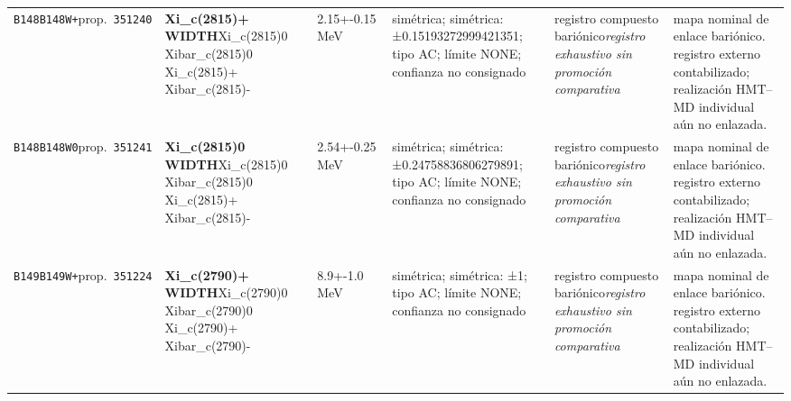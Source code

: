 \begin{landscape}
\begin{longtable}{L{1.85cm}L{4.45cm}L{2.35cm}L{4.05cm}L{3.35cm}L{7.15cm}}
\texttt{B148}\newline \texttt{B148W+}\newline prop.\ \texttt{351240} & \textbf{Xi\_\allowbreak{}c(2815)+ WIDTH}\newline Xi\_\allowbreak{}c(2815)0 \textbar{}\allowbreak{} Xibar\_\allowbreak{}c(2815)0 \textbar{}\allowbreak{} Xi\_\allowbreak{}c(2815)+ \textbar{}\allowbreak{} Xibar\_\allowbreak{}c(2815)- & 2.15+-0.15\,MeV & simétrica; simétrica: ±0.15193272999421351; tipo AC; límite NONE; confianza no consignado & registro compuesto bariónico\newline \emph{registro exhaustivo sin promoción comparativa} & mapa nominal de enlace bariónico. registro externo contabilizado; realización HMT--MD individual aún no enlazada. \\
\texttt{B148}\newline \texttt{B148W0}\newline prop.\ \texttt{351241} & \textbf{Xi\_\allowbreak{}c(2815)0 WIDTH}\newline Xi\_\allowbreak{}c(2815)0 \textbar{}\allowbreak{} Xibar\_\allowbreak{}c(2815)0 \textbar{}\allowbreak{} Xi\_\allowbreak{}c(2815)+ \textbar{}\allowbreak{} Xibar\_\allowbreak{}c(2815)- & 2.54+-0.25\,MeV & simétrica; simétrica: ±0.24758836806279891; tipo AC; límite NONE; confianza no consignado & registro compuesto bariónico\newline \emph{registro exhaustivo sin promoción comparativa} & mapa nominal de enlace bariónico. registro externo contabilizado; realización HMT--MD individual aún no enlazada. \\
\texttt{B149}\newline \texttt{B149W+}\newline prop.\ \texttt{351224} & \textbf{Xi\_\allowbreak{}c(2790)+ WIDTH}\newline Xi\_\allowbreak{}c(2790)0 \textbar{}\allowbreak{} Xibar\_\allowbreak{}c(2790)0 \textbar{}\allowbreak{} Xi\_\allowbreak{}c(2790)+ \textbar{}\allowbreak{} Xibar\_\allowbreak{}c(2790)- & 8.9+-1.0\,MeV & simétrica; simétrica: ±1; tipo AC; límite NONE; confianza no consignado & registro compuesto bariónico\newline \emph{registro exhaustivo sin promoción comparativa} & mapa nominal de enlace bariónico. registro externo contabilizado; realización HMT--MD individual aún no enlazada. \\

\end{longtable}
\end{landscape}
